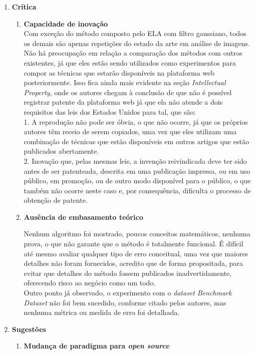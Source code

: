\begin{enumerate}
\item \textbf{Crítica}
    \begin{enumerate}[label*=\arabic*.]
      \item \textbf{Capacidade de inovação}
\\[6pt]      
Com exceção do método composto pelo ELA com filtro gaussiano, todos os demais são apenas repetições do estado da arte em análise de imagens.
\\[6pt]
Não há preocupação em relação a comparação dos métodos com outros existentes, já que eles estão sendo utilizados como experimentos para compor as técnicas que estarão disponíveis na plataforma web posteriormente. Isso fica ainda mais evidente na seção \textit{Intellectual Property}, onde os autores chegam à conclusão de que não é possível registrar patente da plataforma web já que ela não atende a dois requisitos das leis dos Estados Unidos para tal, que são:
\\[6pt]
1. A reprodução não pode ser óbvia, o que não ocorre, já que os próprios autores têm receio de serem copiados, uma vez que eles utilizam uma combinação de técnicas que estão disponíveis em outros artigos que estão publicados abertamente.
\\[6pt]
2. Inovação que, pelas mesmas leis, a invenção reivindicada deve ter sido antes de ser patenteada, descrita em uma publicação impressa, ou em uso público, em promoção, ou de outro modo disponível para o público, o que também não ocorre neste caso e, por consequência, dificulta o processo de obtenção de patente.
\\[6pt]
\item \textbf{Ausência de embasamento teórico}

Nenhum algoritmo foi mostrado, poucos conceitos matemáticos, nenhuma prova, o que não garante que o método é totalmente funcional. É difícil até mesmo avaliar qualquer tipo de erro conceitual, uma vez que maiores detalhes não foram fornecidos, acredito que de forma propositada, para evitar que detalhes do método fossem publicados inadvertidamente, oferecendo risco ao negócio como um todo.
\\[6pt]
Outro ponto já observado, o experimento com o \textit{dataset} \textit{Benchmark Dataset} não foi bem sucedido, conforme citado pelos autores, mas nenhuma métrica ou medida de erro foi detalhada.
\end{enumerate}


\item \textbf{Sugestões}
    \begin{enumerate}[label*=\arabic*.]
\item \textbf{Mudança de paradigma para \textit{open source}}


\end{enumerate}
\end{enumerate}
